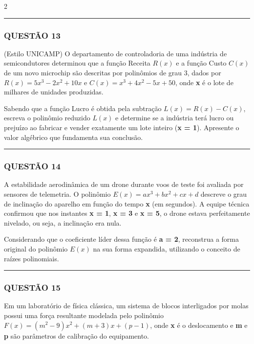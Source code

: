 \documentclass[twoside, 10pt, a4paper]{article}
\begin{document}
\begin{multicols*}{2}
\vspace{0cm} \noindent\textcolor{CorLinha}{\rule{\linewidth}{0.5pt}} \vspace{-0.2cm}
\subsubsection*{QUESTÃO 13}

(Estilo UNICAMP) O departamento de controladoria de uma indústria de semicondutores determinou que a função Receita $ R(x) $ e a função Custo $ C(x) $ de um novo microchip são descritas por polinômios de grau 3, dados por $ R(x) = 5x^3 - 2x^2 + 10x $ e $ C(x) = x^3 + 4x^2 - 5x + 50 $, onde \textbf{x} é o lote de milhares de unidades produzidas.

Sabendo que a função Lucro é obtida pela subtração $ L(x) = R(x) - C(x) $, escreva o polinômio reduzido $ L(x) $ e determine se a indústria terá lucro ou prejuízo ao fabricar e vender exatamente um lote inteiro (\textbf{x = 1}). Apresente o valor algébrico que fundamenta sua conclusão.

\vspace{0cm} \noindent\textcolor{CorLinha}{\rule{\linewidth}{0.5pt}} \vspace{-0.2cm}
\subsubsection*{QUESTÃO 14}

A estabilidade aerodinâmica de um drone durante voos de teste foi avaliada por sensores de telemetria. O polinômio $ E(x) = ax^3 + bx^2 + cx + d $ descreve o grau de inclinação do aparelho em função do tempo \textbf{x} (em segundos). A equipe técnica confirmou que nos instantes \textbf{x = 1}, \textbf{x = 3} e \textbf{x = 5}, o drone estava perfeitamente nivelado, ou seja, a inclinação era nula.

Considerando que o coeficiente líder dessa função é \textbf{a = 2}, reconstrua a forma original do polinômio $ E(x) $ na sua forma expandida, utilizando o conceito de raízes polinomiais.

\vspace{0cm} \noindent\textcolor{CorLinha}{\rule{\linewidth}{0.5pt}} \vspace{-0.2cm}
\subsubsection*{QUESTÃO 15}

Em um laboratório de física clássica, um sistema de blocos interligados por molas possui uma força resultante modelada pelo polinômio $ F(x) = (m^2 - 9)x^2 + (m + 3)x + (p - 1) $, onde \textbf{x} é o deslocamento e \textbf{m} e \textbf{p} são parâmetros de calibração do equipamento.


\end{multicols*}
\end{document}
